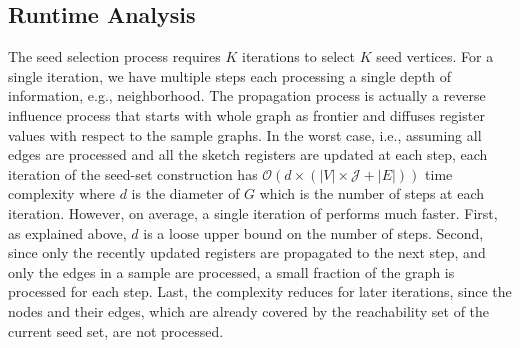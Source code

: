 \documentclass[final,5p,times,twocolumn]{elsarticle}
\newcommand\acro{{\sc{HyperFuseR\xspace}\xspace}\xspace}
\begin{document}

\subsection{Runtime Analysis}\label{sec:runtime}

The seed selection process requires $K$ iterations to select $K$ seed vertices. For a single iteration, we have multiple steps each processing a single depth of information, e.g., neighborhood. The propagation process is actually a reverse influence process that starts with whole graph as frontier and diffuses register values with respect to the sample graphs. In the worst case, i.e., assuming all edges are processed and all the sketch registers are updated at each step, each iteration of the seed-set construction has ${\mathcal O}(d \times (|V|\times \mathcal{J} + |E|))$ time complexity where $d$ is the diameter of $G$ which is the number of steps at each iteration. However, on average, a single iteration of \acro performs much faster. First, as explained above, $d$ is a loose upper bound on the number of steps. Second, since only the recently updated registers are propagated to the next step, and only the edges in a sample are processed, a small fraction of the graph is processed for each step. Last, the complexity reduces for later iterations, since the nodes and their edges, which are already covered by the reachability set of the current seed set, are not processed. 
\end{document}
